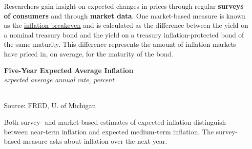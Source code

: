 \documentclass{report}
\makeatletter
\newcommand{\tbllink}[1]{\href{https://raw.githubusercontent.com/bdecon/US-chartbook/master/chartbook/data/#1}{\faTable}}
\newcommand*\short[1]{\expandafter\@gobbletwo\number\numexpr#1\relax}
\newcommand{\absnode}[3]{\node[below right, align=left] at (axis cs: #1,#2) {#3};}
\newcommand{\ltdateaxisticks}{
		date coordinates in=x, axis line style={draw=none},
		xmax={2024-01-31},
		max space between ticks=40,	    
		xtick={{2013-01-01}, {2014-01-01}, {2015-01-01}, {2016-01-01}, 
			{2017-01-01}, {2018-01-01}, {2019-01-01}, {2020-01-01}, {2021-01-01},
			{2022-01-01}, {2023-01-01}, {2024-01-01}},
		enlarge y limits={0.06}, enlarge x limits={0.01},
		xticklabel style={align=center, yshift=-2pt}, tick label style={inner sep=0pt},
		}
\newcommand{\bbar}[2]{extra #1 ticks = {{#2}}, extra #1 tick labels = ,
		extra #1 tick style = {grid=major, grid style={thick, black!25}},}
\newcommand{\stdline}[4]{\addplot[very thick, no markers, color=#1] 
		table [x=#2, y=#3, col sep=comma] {#4};	}
\newcommand{\thinline}[4]{\addplot[no markers, color=#1] 
		table [x=#2, y=#3, col sep=comma] {#4};	}
\newcommand{\rbar}{
		\fill[color=black!10] (axis cs:{2020-02-01},\pgfkeysvalueof{/pgfplots/ymin}) 
			rectangle (axis cs:{2020-05-01}, \pgfkeysvalueof{/pgfplots/ymax});}
\makeatother
\begin{document}
{{\begin{minipage}{1.0\textwidth}
\small Researchers gain insight on expected changes in prices through regular \textbf{surveys of consumers} and through \textbf{market data}. One market-based measure is known as the \href{https://fred.stlouisfed.org/series/T5YIE}{inflation breakeven} and is calculated as the difference between the yield on a nominal treasury bond and the yield on a treasury inflation-protected bond of the same maturity. This difference represents the amount of inflation markets have priced in, on average, for the maturity of the bond.
\end{minipage}
\vspace*{-1mm}

\begin{minipage}{0.39\textwidth}
\normalsize \textbf{Five-Year Expected Average Inflation}\\
\footnotesize{\textit{expected average annual rate, percent}}\\
\hspace*{-2mm} \\
\footnotesize{Source: FRED, U. of Michigan} \hfill \tbllink{infbreak.csv} \ \ 
\vspace{1mm}

\end{minipage} \hspace{4mm} 
\begin{minipage}{0.33\textwidth}
\small 


\end{minipage}
\vspace{1mm}

\begin{minipage}{1.0\textwidth}

\small Both survey- and market-based estimates of expected inflation distinguish between near-term inflation and expected medium-term inflation. The survey-based measure asks about inflation over the next year. 
\vspace{1mm}


\end{minipage}}}
\end{document}
